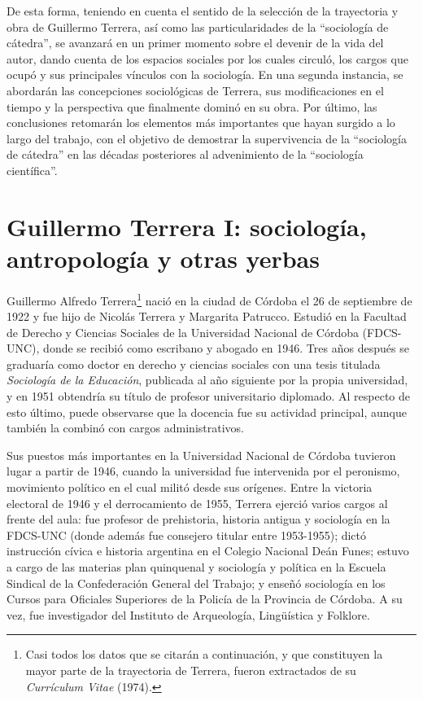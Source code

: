 De esta forma, teniendo en cuenta el sentido de la selección de la trayectoria y obra de Guillermo Terrera, así como las particularidades de la ``sociología de cátedra'', se avanzará en un primer momento sobre el devenir de la vida del autor, dando cuenta de los espacios sociales por los cuales circuló, los cargos que ocupó y sus principales vínculos con la sociología. En una segunda instancia, se abordarán las concepciones sociológicas de Terrera, sus modificaciones en el tiempo y la perspectiva que finalmente dominó en su obra. Por último, las conclusiones retomarán los elementos más importantes que hayan surgido a lo largo del trabajo, con el objetivo de demostrar la supervivencia de la ``sociología de cátedra'' en las décadas posteriores al advenimiento de la ``sociología científica''.

\section{Guillermo Terrera I: sociología, antropología y otras yerbas}

Guillermo Alfredo Terrera\footnote{Casi todos los datos que se citarán a continuación, y que constituyen la mayor parte de la trayectoria de Terrera, fueron extractados de su \emph{Currículum Vitae} (1974).} nació en la ciudad de Córdoba el 26 de septiembre de 1922 y fue hijo de Nicolás Terrera y Margarita Patrucco. Estudió en la Facultad de Derecho y Ciencias Sociales de la Universidad Nacional de Córdoba (FDCS-UNC), donde se recibió como escribano y abogado en 1946. Tres años después se graduaría como doctor en derecho y ciencias sociales con una tesis titulada \emph{Sociología de la Educación}, publicada al año siguiente por la propia universidad, y en 1951 obtendría su título de profesor universitario diplomado. Al respecto de esto último, puede observarse que la docencia fue su actividad principal, aunque también la combinó con cargos administrativos.

Sus puestos más importantes en la Universidad Nacional de Córdoba tuvieron lugar a partir de 1946, cuando la universidad fue intervenida por el peronismo, movimiento político en el cual militó desde sus orígenes. Entre la victoria electoral de 1946 y el derrocamiento de 1955, Terrera ejerció varios cargos al frente del aula: fue profesor de prehistoria, historia antigua y sociología en la FDCS-UNC (donde además fue consejero titular entre 1953-1955); dictó instrucción cívica e historia argentina en el Colegio Nacional Deán Funes; estuvo a cargo de las materias plan quinquenal y sociología y política en la Escuela Sindical de la Confederación General del Trabajo; y enseñó sociología en los Cursos para Oficiales Superiores de la Policía de la Provincia de Córdoba. A su vez, fue investigador del Instituto de Arqueología, Lingüística y Folklore.

